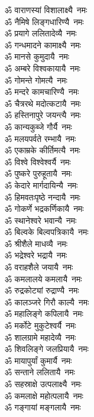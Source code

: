 \begin{multicols}{2}
\begin{flushleft}
ॐ वाराणस्यां विशालाक्ष्यै~नमः\\
ॐ नैमिषे लिङ्गधारिण्यै~नमः\\
ॐ प्रयागे ललितादेव्यै~नमः\\
ॐ गन्धमादने कामाक्ष्यै~नमः\\
ॐ मानसे कुमुदायै~नमः\\
ॐ अम्बरे विश्वकायायै~नमः\\
ॐ गोमन्ते गोमत्यै~नमः\\
ॐ मन्दरे कामचारिण्यै~नमः\\
ॐ चैत्ररथे मदोत्कटायै~नमः\\
ॐ हस्तिनापुरे जयन्त्यै~नमः\hfill{}\\
ॐ कान्यकुब्जे गौर्यै~नमः\\
ॐ मलयपर्वते रम्भायै~नमः\\
ॐ एकाम्रके कीर्तिमत्यै~नमः\\
ॐ विश्वे विश्वेश्वर्यै~नमः\\
ॐ पुष्करे पुरुहूतायै~नमः\\
ॐ केदारे मार्गदायिन्यै~नमः\\
ॐ हिमवतःपृष्ठे नन्दायै~नमः\\
ॐ गोकर्णे भद्रकर्णिकायै~नमः\\
ॐ स्थानेश्वरे भवान्यै~नमः\\
ॐ बिल्वके बिल्वपत्रिकायै~नमः\hfill{}\\
ॐ श्रीशैले माधव्यै~नमः\\
ॐ भद्रेश्वरे भद्रायै~नमः\\
ॐ वराहशैले जयायै~नमः\\
ॐ कमलालये कमलायै~नमः\\
ॐ रुद्रकोट्यां रुद्राण्यै~नमः\\
ॐ कालञ्जरे गिरौ काल्यै~नमः\\
ॐ महालिङ्गे कपिलायै~नमः\\
ॐ मर्कोटे मुकुटेश्वर्यै~नमः\\
ॐ शालग्रामे महादेव्यै~नमः\\
ॐ शिवलिङ्गे जलप्रियायै~नमः\hfill{}\\
ॐ मायापुर्यां कुमार्यै~नमः\\
ॐ सन्ताने ललितायै~नमः\\
ॐ सहस्राक्षे उत्पलाक्ष्यै~नमः\\
ॐ कमलाक्षे महोत्पलायै~नमः\\
ॐ गङ्गायां मङ्गलायै~नमः\\

\end{flushleft}
\end{multicols}
